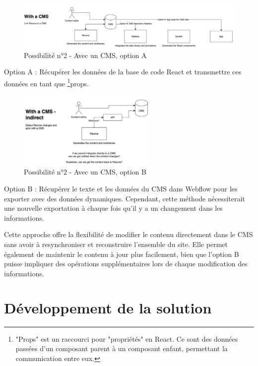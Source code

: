 \begin{figure}[h] 
  \centering
  \includegraphics[width=1\textwidth]{Includes/Images/connection2.png}
  \caption{Possibilité n°2 - Avec un CMS, option A}
  \label{fig: Possibilité n°2 - Avec un CMS, option A}
\end{figure} 

Option A : Récupérer les données de la base de code React et transmettre ces données en tant que \footnote{"Props" est un raccourci pour "propriétés" en React. Ce sont des données passées d'un composant parent à un composant enfant, permettant la communication entre eux.}props.

\begin{figure}[h] 
  \centering
  \includegraphics[width=0.6\textwidth]{Includes/Images/connection3.png}
  \caption{Possibilité n°2 - Avec un CMS, option B}
  \label{fig: Possibilité n°2 - Avec un CMS, option B}
\end{figure} 

Option B : Récupérer le texte et les données du CMS dans Webflow pour les exporter avec des données dynamiques. Cependant, cette méthode nécessiterait une nouvelle exportation à chaque fois qu'il y a un changement dans les informations.

Cette approche offre la flexibilité de modifier le contenu directement dans le CMS sans avoir à resynchroniser et reconstruire l'ensemble du site. Elle permet également de maintenir le contenu à jour plus facilement, bien que l'option B puisse impliquer des opérations supplémentaires lors de chaque modification des informations.

\section{Développement de la solution}

